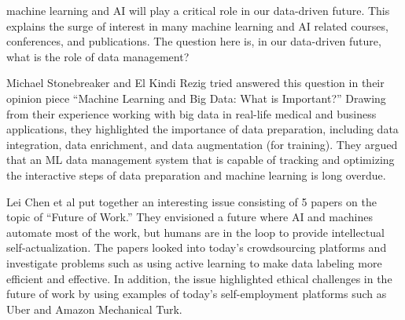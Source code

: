\documentclass[11pt]{article}
\begin{document}
machine learning and AI will play a critical role in our data-driven
future. This explains the surge of interest in many machine learning
and AI related courses, conferences, and publications. The question
here is, in our data-driven future, what is the role of data
management?

Michael Stonebreaker and El Kindi Rezig tried answered this question
in their opinion piece ``Machine Learning and Big Data: What is
Important?'' Drawing from their experience working with big data in
real-life medical and business applications, they highlighted the
importance of data preparation, including data integration, data
enrichment, and data augmentation (for training). They argued that an
ML data management system that is capable of tracking and optimizing
the interactive steps of data preparation and machine learning is long
overdue.

Lei Chen et al put together an interesting issue consisting of 5
papers on the topic of ``Future of Work.'' They envisioned a future
where AI and machines automate most of the work, but humans are in the
loop to provide intellectual self-actualization. The papers looked
into today's crowdsourcing platforms and investigate problems such as
using active learning to make data labeling more efficient and
effective. In addition, the issue highlighted ethical challenges in
the future of work by using examples of today's self-employment
platforms such as Uber and Amazon Mechanical Turk.
\end{document}
